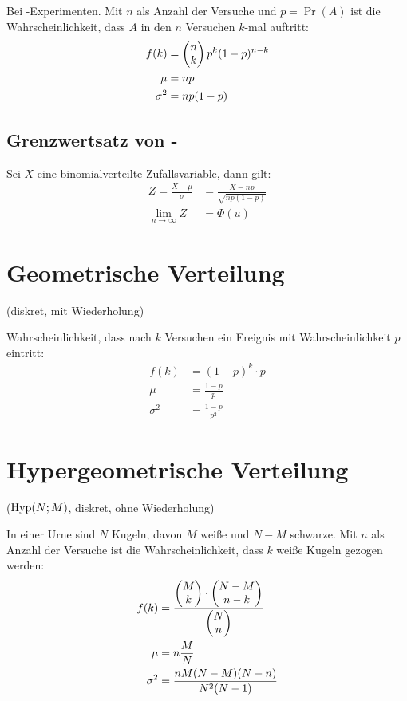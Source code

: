 Bei -Experimenten. Mit $n$ als Anzahl der Versuche und $p=\Pr(A)$ ist die Wahrscheinlichkeit, dass $A$ in den $n$ Versuchen $k$-mal auftritt:
\begin{align*}
  f(k)       & = \vecc(n;k) p^k (1-p)^{n-k}\\
  \mu        & = np\\
  \sigma^{2} & = np(1-p)
\end{align*}



\subsection{Grenzwertsatz von \protect{}-\protect{}}

Sei $X$ eine binomialverteilte Zufallsvariable, dann gilt:
\begin{align*}
  Z=\frac{X-\mu}{\sigma} & =\frac{X-np}{\sqrt{np(1-p)}}\\
  \lim_{n\to\infty}Z     & =\Phi(u)
\end{align*}



\section{Geometrische Verteilung}

(diskret, mit Wiederholung)

Wahrscheinlichkeit, dass nach $k$ Versuchen ein Ereignis mit Wahrscheinlichkeit $p$ eintritt:
\begin{align*}
  f(k)       & =(1-p)^{k}\cdot p\\
  \mu        & =\frac{1-p}{p}\\
  \sigma^{2} & =\frac{1-p}{p^{2}}
\end{align*}



\section{Hypergeometrische Verteilung}

($\operatorname{Hyp}(N;M)$, diskret, ohne Wiederholung)

In einer Urne sind $N$ Kugeln, davon $M$ weiße und $N-M$ schwarze. Mit $n$ als Anzahl der Versuche ist die Wahrscheinlichkeit, dass $k$ weiße Kugeln gezogen werden:
\begin{align*}
  f(k)       & = \frac{\vecc(M;k) \cdot \vecc(N-M;n-k)}{\vecc(N;n)}\\
  \mu        & = n\frac{M}{N}\\
  \sigma^{2} & = \frac{nM(N-M)(N-n)}{N^{2}(N-1)}
\end{align*}



